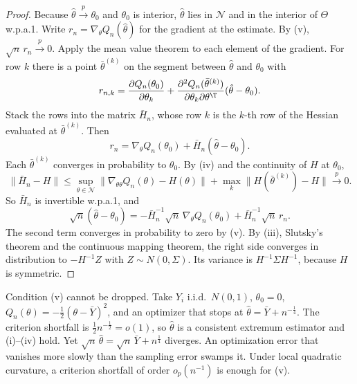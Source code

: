 \begin{proof}
Because $\hat\theta \xrightarrow{p} \theta_0$ and $\theta_0$ is interior, $\hat\theta$ lies in $\mathcal{N}$ and in the
interior of $\Theta$ w.p.a.1. Write $r_n = \nabla_\theta Q_n(\hat\theta)$ for the gradient at the estimate. By (v),
$\sqrt{n}\,r_n \xrightarrow{p} 0$. Apply the mean value theorem to each element of the gradient. For row $k$ there is a point
$\bar\theta^{(k)}$ on the segment between $\hat\theta$ and $\theta_0$ with
\begin{equation*}
  r_{n,k} = \frac{\partial Q_n(\theta_0)}{\partial\theta_k} + \frac{\partial^2 Q_n(\bar\theta^{(k)})}{\partial\theta_k\partial\theta^\T}
  (\hat\theta - \theta_0).
\end{equation*}
Stack the rows into the matrix $\bar H_n$, whose row $k$ is the $k$-th row of the Hessian evaluated at $\bar\theta^{(k)}$.
Then
\begin{equation*}
  r_n = \nabla_\theta Q_n(\theta_0) + \bar H_n(\hat\theta - \theta_0).
\end{equation*}
Each $\bar\theta^{(k)}$ converges in probability to $\theta_0$. By (iv) and the continuity of $H$ at $\theta_0$,
\begin{equation*}
  \lVert\bar H_n - H\rVert \le \sup_{\theta \in \mathcal{N}}\lVert\nabla_{\theta\theta}Q_n(\theta) - H(\theta)\rVert
  + \max_k\lVert H(\bar\theta^{(k)}) - H\rVert \xrightarrow{p} 0.
\end{equation*}
So $\bar H_n$ is invertible w.p.a.1, and
\begin{equation*}
  \sqrt{n}(\hat\theta - \theta_0) = -\bar H_n^{-1}\sqrt{n}\,\nabla_\theta Q_n(\theta_0) + \bar H_n^{-1}\sqrt{n}\,r_n.
\end{equation*}
The second term converges in probability to zero by (v). By (iii), Slutsky's theorem and the continuous mapping theorem, the
right side converges in distribution to $-H^{-1}Z$ with $Z \sim N(0, \Sigma)$. Its variance is $H^{-1}\Sigma H^{-1}$, because
$H$ is symmetric.
\end{proof}

Condition (v) cannot be dropped. Take $Y_i$ i.i.d.\ $N(0,1)$, $\theta_0 = 0$, $Q_n(\theta) = -\frac{1}{2}(\theta - \bar Y)^2$,
and an optimizer that stops at $\hat\theta = \bar Y + n^{-\frac{1}{4}}$. The criterion shortfall is
$\frac{1}{2}n^{-\frac{1}{2}} = o(1)$, so $\hat\theta$ is a consistent extremum estimator and (i)--(iv) hold. Yet
$\sqrt{n}\,\hat\theta = \sqrt{n}\,\bar Y + n^{\frac{1}{4}}$ diverges. An optimization error that vanishes more slowly than
the sampling error swamps it. Under local quadratic curvature, a criterion shortfall of order $o_p(n^{-1})$ is enough for (v).

